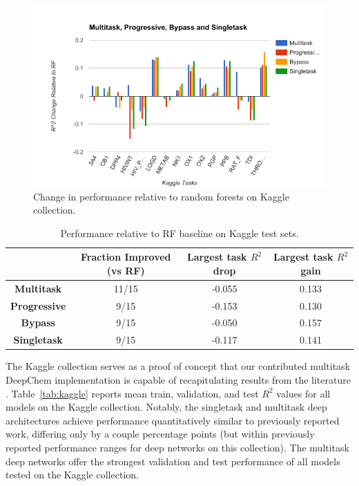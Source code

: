 \begin{figure}[H]
  \includegraphics[width=.9\textwidth]{Images/Kaggle_imp.png}
  \caption{Change in performance relative to random forests on Kaggle collection.}
  \label{fig:kaggle-imp}
\end{figure}
\begin{table}[h]
    \centering
    \begin{tabular}{ |c|c|c|c| } 
    \hline
     & Fraction Improved (vs RF) & Largest task $R^2$ drop & Largest task $R^2$ gain \\ 
    \hline
    \textbf{Multitask} & 11/15 & -0.055 & 0.133  \\
    \hline
    \textbf{Progressive} & 9/15 & -0.153 & 0.130  \\
    \hline
    \textbf{Bypass} & 9/15 & -0.050 & 0.157  \\
    \hline
    \textbf{Singletask} & 9/15 & -0.117 & 0.141  \\
    \hline
    \end{tabular}
    \caption{Performance relative to RF baseline on Kaggle test sets.}
    \label{tab:kaggle-comp}
\end{table}

The Kaggle collection serves as a proof of concept that our contributed multitask DeepChem implementation is capable of recapitulating results from the literature \cite{ma2015deep}. Table~\ref{tab:kaggle} reports mean train, validation, and test $R^2$ values for all models on the Kaggle collection. Notably, the singletask and multitask deep architectures achieve performance quantitatively similar to previously reported work, differing only by a couple percentage points (but within previously reported performance ranges for deep networks on this collection). The multitask deep networks offer the strongest validation and test performance of all models tested on the Kaggle collection.


